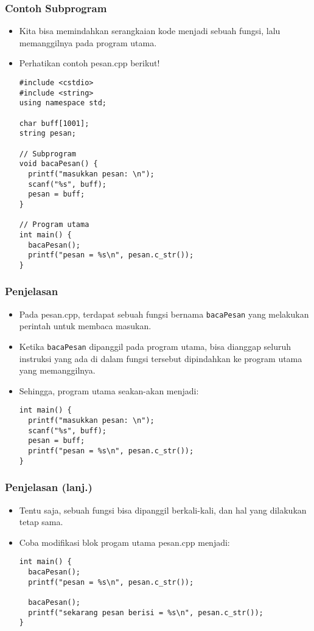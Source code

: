 \begin{frame}[fragile]
\frametitle{Contoh Subprogram}
\begin{itemize}
  \item Kita bisa memindahkan serangkaian kode menjadi sebuah fungsi, lalu memanggilnya pada program utama.
  \item Perhatikan contoh pesan.cpp berikut!
\begin{lstlisting}
#include <cstdio>
#include <string>
using namespace std;

char buff[1001];
string pesan;

// Subprogram
void bacaPesan() {
  printf("masukkan pesan: \n");
  scanf("%s", buff);
  pesan = buff;
}

// Program utama
int main() {
  bacaPesan();
  printf("pesan = %s\n", pesan.c_str());
}
\end{lstlisting}
\end{itemize}
\end{frame}

\begin{frame}[fragile]
\frametitle{Penjelasan}
\begin{itemize}
  \item Pada pesan.cpp, terdapat sebuah fungsi bernama \texttt{bacaPesan} yang melakukan perintah untuk membaca masukan.
  \item Ketika \texttt{bacaPesan} dipanggil pada program utama, bisa dianggap seluruh instruksi yang ada di dalam fungsi tersebut dipindahkan ke program utama yang memanggilnya.
  \item Sehingga, program utama seakan-akan menjadi:
\begin{lstlisting}
int main() {
  printf("masukkan pesan: \n");
  scanf("%s", buff);
  pesan = buff;
  printf("pesan = %s\n", pesan.c_str());
}
\end{lstlisting}
\end{itemize}
\end{frame}

\begin{frame}[fragile]
\frametitle{Penjelasan (lanj.)}
\begin{itemize}
  \item Tentu saja, sebuah fungsi bisa dipanggil berkali-kali, dan hal yang dilakukan tetap sama.
  \item Coba modifikasi blok progam utama pesan.cpp menjadi:
\begin{lstlisting}
int main() {
  bacaPesan();
  printf("pesan = %s\n", pesan.c_str());

  bacaPesan();
  printf("sekarang pesan berisi = %s\n", pesan.c_str());
}
\end{lstlisting}
\end{itemize}
\end{frame}

